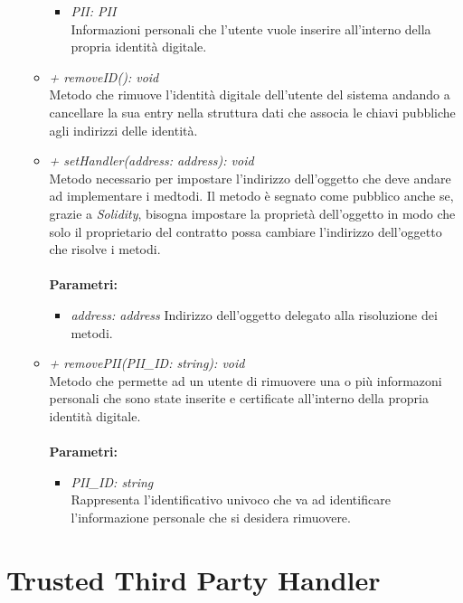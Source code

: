 \begin{itemize}
\begin{itemize}
\begin{itemize}
			\item \textit{PII: PII}\\
			Informazioni personali che l'utente vuole inserire all'interno della propria identità digitale.
		\end{itemize}
		\item \textit{+ removeID(): void}\\
		Metodo che rimuove l'identità digitale dell'utente del sistema andando a cancellare la sua entry nella struttura dati che associa le chiavi pubbliche agli indirizzi delle identità.
		\item \textit{+ setHandler(address: address): void}\\
		Metodo necessario per impostare l'indirizzo dell'oggetto che deve andare ad implementare i medtodi. Il metodo è segnato come pubblico anche se, grazie a \textit{Solidity}, bisogna impostare la proprietà dell'oggetto in modo che solo il proprietario del contratto possa cambiare l'indirizzo dell'oggetto che risolve i metodi.\\\\
		\textbf{Parametri:}
		\begin{itemize}
			\item \textit{address: address}
			Indirizzo dell'oggetto delegato alla risoluzione dei metodi.
		\end{itemize}
		\item \textit{+ removePII(PII\_ID: string): void}\\
		Metodo che permette ad un utente di rimuovere una o più informazoni personali che sono state inserite e certificate all'interno della propria identità digitale.\\\\
		\textbf{Parametri:}
		\begin{itemize}
			\item \textit{PII\_ID: string}\\
			Rappresenta l'identificativo univoco che va ad identificare l'informazione personale che si desidera rimuovere.
		\end{itemize}
	\end{itemize}
\end{itemize}
\section{Trusted Third Party Handler}
